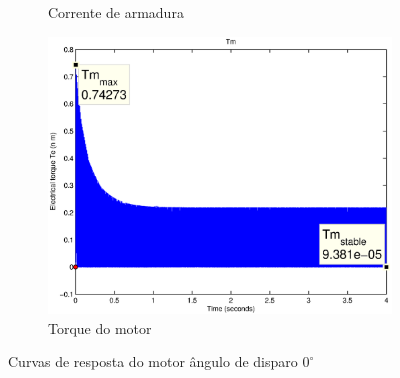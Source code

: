 \documentclass{article}
\begin{document}
\begin{figure}[H]
\begin{subfigure}[b]{0.49\linewidth}
		\caption{Corrente de armadura}
	\end{subfigure}
	\begin{subfigure}[b]{0.49\linewidth}
		\centering
		\includegraphics[width=\linewidth]{matlab/tm4}
		\caption{Torque do motor}
	\end{subfigure}
	\caption{Curvas de resposta do motor ângulo de disparo $0^\circ$}
	\label{fig:res4}
\end{figure}
\end{document}
